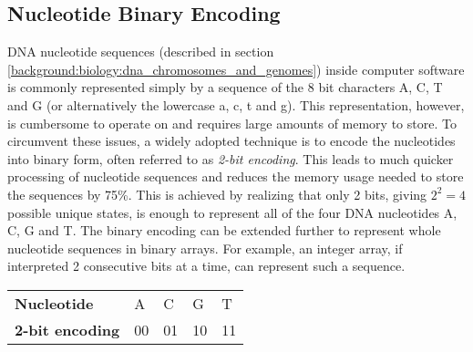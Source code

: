 \subsection{Nucleotide Binary Encoding} \label{background:nucleotide_binary_encoding}

DNA nucleotide sequences (described in section \ref{background:biology:dna_chromosomes_and_genomes}) inside computer software is commonly represented simply by a sequence of the 8 bit characters A, C, T and G (or alternatively the lowercase a, c, t and g).
This representation, however, is cumbersome to operate on and requires large amounts of memory to store.
To circumvent these issues, a widely adopted technique is to encode the nucleotides into binary form, often referred to as \textit{2-bit encoding}.
This leads to much quicker processing of nucleotide sequences and reduces the memory usage needed to store the sequences by 75\%.
This is achieved by realizing that only 2 bits, giving \textit{$2^2=4$} possible unique states, is enough to represent all of the four DNA nucleotides A, C, G and T.
The binary encoding can be extended further to represent whole nucleotide sequences in binary arrays.
For example, an integer array, if interpreted 2 consecutive bits at a time, can represent such a sequence.

\vspace*{.5em}

\begin{table}[H]
\begin{center}
\begin{tabular}{lllll}
  \cline{1-5}
  \multicolumn{1}{l}{\small\textbf{Nucleotide}} & \multicolumn{1}{l}{A} & \multicolumn{1}{l}{C} & \multicolumn{1}{l}{G} & \multicolumn{1}{l}{T} \\
  \multicolumn{1}{l}{\small\textbf{2-bit encoding}} & \multicolumn{1}{l}{00} & \multicolumn{1}{l}{01} & \multicolumn{1}{l}{10} & \multicolumn{1}{l}{11} \\
  \cline{1-5}
\end{tabular}
\end{center}
\label{background:nucleotide_binary_encoding:tables:nucleotide_to_binary}
\end{table}

\vspace*{-2em}


